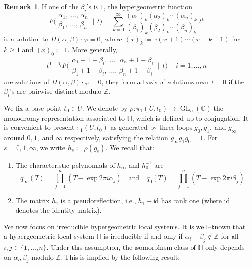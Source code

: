 \documentclass[11pt, reqno]{amsart}
\theoremstyle{plain}
\theoremstyle{definition}
\newtheorem{rem}[thm]{Remark}
\newcommand{\CC}{\mathbb{C}}
\newcommand{\ZZ}{\mathbb{Z}}
\newcommand{\HH}{\mathbb{H}}
\newcommand{\be}{\beta}
\begin{document}
\begin{rem}\label{rem:hypergeometric-functions}
If one of the $\beta_i$'s is $1$, the hypergeometric function 
\begin{equation}\label{eq:HGfunction-defi}
F\biggl(\begin{matrix} \alpha_1, \ \ldots, \ \alpha_n \\ \beta_1, \ \ldots, \ \beta_n \end{matrix} \:\bigg|\:\: t \biggr)=\sum_{k=0}^\infty \frac{(\alpha_1)_k(\alpha_2)_k\cdots (\alpha_n)_k}{(\be_1)_k(\be_2)_k\cdots (\be_n)_k} \: t^k
\end{equation} 
is a solution to $H(\alpha,\beta) \cdot \varphi =0$, where $(x)_k\coloneqq x(x+1)\cdots(x+k-1)$ for $k \geq 1$ and $(x)_0\coloneqq 1$. 
More generally,  
\[t^{1-\beta_i}
F\biggl(\begin{matrix} \alpha_1+1-\beta_i, \ \ldots, \ \alpha_n+1-\beta_i \\ \be_1+1-\beta_i, \ \ldots, \ \be_n+1-\beta_i \end{matrix} \:\bigg|\:\: t \biggr)
\quad \  i=1,\dots,n\]
are solutions of $H(\alpha,\beta) \cdot \varphi =0$; they form a basis of solutions near $t=0$ if the $\beta_i$'s are pairwise distinct modulo $\mathbb{Z}.$
\end{rem}


We fix a base point $t_0 \in U$. We denote by $\rho: \pi_1(U, t_0) \to \operatorname{GL}_n(\CC)$ the monodromy representation associated to $\HH$, which is defined up to conjugation. 
It is convenient to present $\pi_1(U, t_0)$ as generated by three loops $g_0, g_1,$ and $g_\infty$ around $0, 1,$ and $\infty$ respectively, satisfying the relation $g_\infty g_1 g_0=1.$ For $s= 0, 1, \infty$, we write $h_s \coloneqq \rho(g_s)$. 
We recall that:
\begin{enumerate}
    \item \label{item:char-pol}
    The characteristic polynomials of $h_\infty$ and $h_0^{-1}$ are 
\begin{equation}
\label{eq:char-polys}
q_\infty(T)=\prod_{j=1}^n (T-\exp{2\pi i \alpha_j})  \quad  \text{and} \quad q_0(T)=\prod_{j=1}^n (T-\exp{2\pi i \beta_j})
\end{equation} 
    \item \label{item:pseudo-reflec}The matrix $h_1$ is a pseudoreflection, i.e., $h_1-\mathrm{id}$ has rank one (where $\mathrm{id}$ denotes the identity matrix). 
\end{enumerate}
\smallskip

We now focus on irreducible hypergeometric local systems. 
It is well--known that a hypergeometric local system $\HH$ is irreducible if and only if $\alpha_i - \beta_j \notin \ZZ$ for all $i,j \in \{1, \dots, n\}$. Under this assumption, the isomorphism class of $\HH$ only depends on  $\alpha_i, \beta_j$ modulo $\ZZ$. This is implied by the following result:
\end{document}
